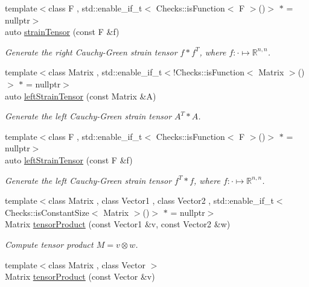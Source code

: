 \begin{DoxyCompactItemize}
{\footnotesize template$<$class F , std\-::enable\-\_\-if\-\_\-t$<$ Checks\-::is\-Function$<$ F $>$()$>$ $\ast$  = nullptr$>$ }\\auto \hyperlink{namespacefuncy_1_1LinearAlgebra_af5b125ebe7ad3358d32796a3305bb76b}{strain\-Tensor} (const F \&f)
\begin{DoxyCompactList}\small\item\em Generate the right Cauchy-\/\-Green strain tensor $f*f^T$, where $f:\cdot\mapsto\mathbb{R}^{n,n} $. \end{DoxyCompactList}\item 
{\footnotesize template$<$class Matrix , std\-::enable\-\_\-if\-\_\-t$<$!\-Checks\-::is\-Function$<$ Matrix $>$()$>$ $\ast$  = nullptr$>$ }\\auto \hyperlink{namespacefuncy_1_1LinearAlgebra_aab1b8d60b9d90f8225a743686a9229b8}{left\-Strain\-Tensor} (const Matrix \&A)
\begin{DoxyCompactList}\small\item\em Generate the left Cauchy-\/\-Green strain tensor $A^T*A$. \end{DoxyCompactList}\item 
{\footnotesize template$<$class F , std\-::enable\-\_\-if\-\_\-t$<$ Checks\-::is\-Function$<$ F $>$()$>$ $\ast$  = nullptr$>$ }\\auto \hyperlink{namespacefuncy_1_1LinearAlgebra_a68eb9f89b75132e9ab77829e188cf8a7}{left\-Strain\-Tensor} (const F \&f)
\begin{DoxyCompactList}\small\item\em Generate the left Cauchy-\/\-Green strain tensor $f^T*f$, where $f:\cdot\mapsto\mathbb{R}^{n,n} $. \end{DoxyCompactList}\item 
{\footnotesize template$<$class Matrix , class Vector1 , class Vector2 , std\-::enable\-\_\-if\-\_\-t$<$ Checks\-::is\-Constant\-Size$<$ Matrix $>$()$>$ $\ast$  = nullptr$>$ }\\Matrix \hyperlink{group__LinearAlgebraGroup_gabbd540f49b8005cfed789e216443744d}{tensor\-Product} (const Vector1 \&v, const Vector2 \&w)
\begin{DoxyCompactList}\small\item\em Compute tensor product $ M = v \otimes w $. \end{DoxyCompactList}\item 
{\footnotesize template$<$class Matrix , class Vector $>$ }\\Matrix \hyperlink{group__LinearAlgebraGroup_gaf2bb42fe59352ef2090cb2907890e1d5}{tensor\-Product} (const Vector \&v)

\end{DoxyCompactItemize}
